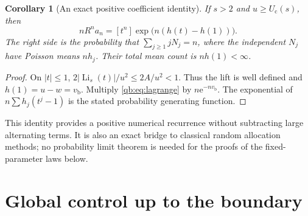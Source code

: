 \documentclass[11pt,a4paper]{article}
\newtheorem{corollary}[theorem]{Corollary}
\theoremstyle{definition}\newtheorem{definition}[theorem]{Definition}
\theoremstyle{remark}\newtheorem{remark}[theorem]{Remark}
\newcommand{\Li}{\operatorname{Li}}
\newcommand{\ee}{\mathrm e}
\newcommand{\Uc}{U_{\mathrm c}}
\newcommand{\vb}{v_{\mathrm b}}
\numberwithin{equation}{section}
\begin{document}
\begin{corollary}[An exact positive coefficient identity]\label{qb:cor:prob}
If $s>2$ and $u\ge\Uc(s)$, then
\begin{equation}\label{qb:eq:probability}
 nR^na_n=[t^n]\exp\bigl(n(h(t)-h(1))\bigr).
\end{equation}
The right side is the probability that
\(\sum_{j\ge1}jN_j=n\), where the independent $N_j$ have Poisson means
$nh_j$. Their total mean count is $nh(1)<\infty$.
\end{corollary}
\begin{proof}
On $|t|\le1$, $2|\Li_s(t)|/u^2\le2A/u^2<1$. Thus the lift is well
defined and $h(1)=u-w=\vb$. Multiply \eqref{qb:eq:lagrange} by
$n\ee^{-n\vb}$. The exponential of
$n\sum h_j(t^j-1)$ is the stated probability generating function.
\end{proof}

This identity provides a positive numerical recurrence without subtracting
large alternating terms. It is also an exact bridge to classical random
allocation methods; no probability limit theorem is needed for the proofs
of the fixed-parameter laws below.

\section{Global control up to the boundary}\label{qb:sec:global}
\end{document}
